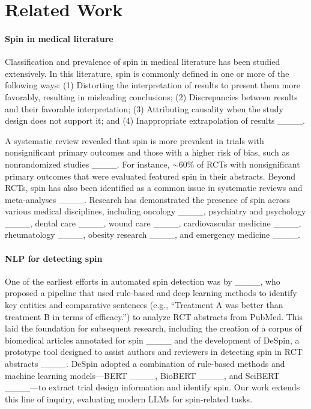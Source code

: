 \section{Related Work}
\label{section:related_work}

\paragraph{Spin in medical literature} Classification and prevalence of spin in medical literature has been studied extensively. 
In this literature, spin is commonly defined in one or more of the following ways: (1) Distorting the interpretation of results to present them more favorably, resulting in misleading conclusions; (2) Discrepancies between results and their favorable interpretation; (3) Attributing causality when the study design does not support it; and (4) Inappropriate extrapolation of results ____.

A systematic review revealed that spin is more prevalent in trials with nonsignificant primary outcomes and those with a higher risk of bias, such as nonrandomized studies ____. For instance, $\sim$60\% of RCTs with nonsignificant primary outcomes that were evaluated featured spin in their abstracts. 
Beyond RCTs, spin has also been identified as a common issue in systematic reviews and meta-analyses ____. Research has demonstrated the presence of spin across various medical disciplines, including oncology ____, psychiatry and psychology ____, dental care ____, wound care ____, cardiovascular medicine ____, rheumatology ____, obesity research ____, and emergency medicine ____.

\paragraph{NLP for detecting spin} One of the earliest efforts in automated spin detection was by ____, who proposed a pipeline that used rule-based and deep learning methods to identify key entities and comparative sentences (e.g., ``Treatment A was better than treatment B in terms of efficacy.'') to analyze RCT abstracts from PubMed.
This laid the foundation for subsequent research, including the creation of a corpus of biomedical articles annotated for spin ____ and the development of DeSpin, a prototype tool designed to assist authors and reviewers in detecting spin in RCT abstracts ____. 
DeSpin adopted a combination of rule-based methods and machine learning models---BERT ____, BioBERT ____, and SciBERT ____---to extract trial design information and identify spin. 
Our work extends this line of inquiry, evaluating modern LLMs for spin-related tasks.

